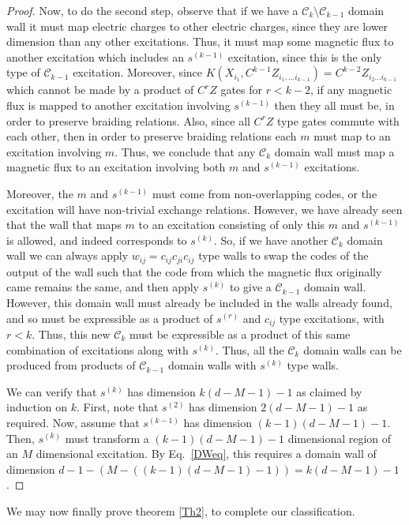 \documentclass[pra,twocolumn,a4paper,nofootinbib]{revtex4-1}
\begin{document}
\begin{proof}
Now, to do the second step, observe that if we have a $\mathcal{C}_k \setminus \mathcal{C}_{k-1}$ domain wall it must map electric charges to other electric charges, since they are lower dimension than any other excitations. Thus, it must map some magnetic flux to another excitation which includes an $s^{(k-1)}$ excitation, since this is the only type of $\mathcal{C}_{k-1}$ excitation. Moreover, since $K(X_{i_1}, C^{k-1}Z_{i_1, \ldots i_{k-1}})=C^{k-2}Z_{i_2 \ldots i_{k-1}}$ which cannot be made by a product of $C^rZ$ gates for $r<k-2$, if any magnetic flux is mapped to another excitation involving $s^{(k-1)}$ then they all must be, in order to preserve braiding relations. Also, since all $C^rZ$ type gates commute with each other, then in order to preserve braiding relations each $m$ must map to an excitation involving $m$. Thus, we conclude that any $\mathcal{C}_k$ domain wall must map a magnetic flux to an excitation involving both $m$ and $s^{(k-1)}$ excitations. 

Moreover, the $m$ and $s^{(k-1)}$ must come from non-overlapping codes, or the excitation will have non-trivial exchange relations. However, we have already seen that the wall that maps $m$ to an excitation consisting of only this $m$ and $s^{(k-1)}$ is allowed, and indeed corresponds to $s^{(k)}$. So, if we have another $\mathcal{C}_k$ domain wall we can always apply $w_{ij}=c_{ij}c_{ji}c_{ij}$ type walls to swap the codes of the output of the wall such that the code from which the magnetic flux originally came remains the same, and then apply $s^{(k)}$ to give a $\mathcal{C}_{k-1}$ domain wall. However, this domain wall must already be included in the walls already found, and so must be expressible as a product of $s^{(r)}$ and $c_{ij}$ type excitations, with $r<k$. Thus, this new $\mathcal{C}_k$ must be expressible as a product of this same combination of excitations along with $s^{(k)}$. Thus, all the $\mathcal{C}_k$ domain walls can be produced from products of $\mathcal{C}_{k-1}$ domain walls with $s^{(k)}$ type walls.

We can verify that $s^{(k)}$ has dimension $k(d-M-1)-1$ as claimed by induction on $k$. First, note that $s^{(2)}$ has dimension $2(d-M-1)-1$ as required. Now, assume that $s^{(k-1)}$ has dimension $(k-1)(d-M-1)-1$. Then, $s^{(k)}$ must transform a $(k-1)(d-M-1)-1$ dimensional region of an $M$ dimensional excitation. By Eq.~\ref{DWeq}, this requires a domain wall of dimension $d-1-(M-((k-1)(d-M-1)-1))=k(d-M-1)-1$.
\end{proof}
We may now finally prove theorem \ref{Th2}, to complete our classification.
\end{document}
